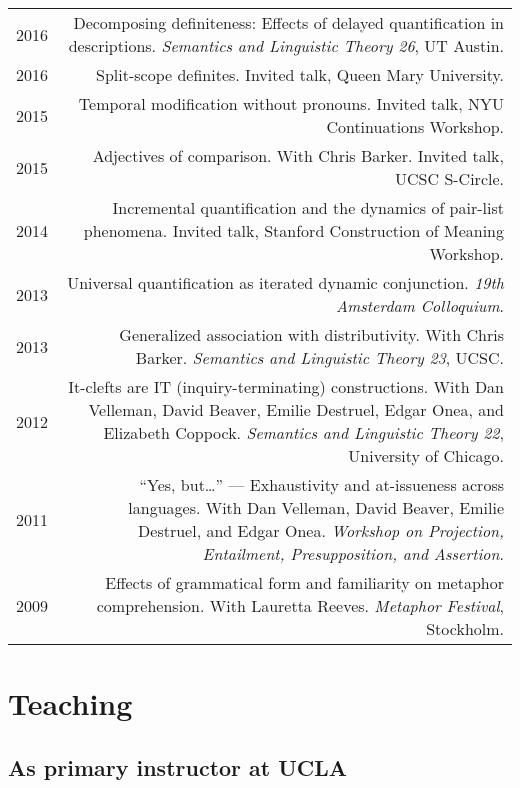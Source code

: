 \documentclass[12pt]{article}
\begin{document}
\begin{longtable}{LR}
  2016 & Decomposing definiteness: Effects of delayed quantification in
         descriptions.
         \textit{Semantics and Linguistic Theory 26}, UT Austin.\\
  2016 & Split-scope definites.
         Invited talk, Queen Mary University.\\
  2015 & Temporal modification without pronouns.
         Invited talk, NYU Continuations Workshop.\\
  2015 & Adjectives of comparison.
         With Chris Barker.
         Invited talk, UCSC S-Circle.\\
  2014 & Incremental quantification and the dynamics of pair-list phenomena.
         Invited talk, Stanford Construction of Meaning Workshop.\\
  2013 & Universal quantification as iterated dynamic conjunction.
         \textit{19th Amsterdam Colloquium}. \\
  2013 & Generalized association with distributivity.
         With Chris Barker.
         \textit{Semantics and Linguistic Theory 23}, UCSC.\\
  2012 & It-clefts are IT (inquiry-terminating) constructions.
         With Dan Velleman, David Beaver, Emilie Destruel, Edgar Onea, and
         Elizabeth Coppock.
         \textit{Semantics and Linguistic Theory 22}, University of Chicago.\\
  2011 & ``Yes, but\dots'' --- Exhaustivity and at-issueness across languages.
          With Dan Velleman, David Beaver, Emilie Destruel, and Edgar Onea.
          \textit{Workshop on Projection, Entailment, Presupposition, and
          Assertion}.\\
  2009 & Effects of grammatical form and familiarity on metaphor
         comprehension.
         With Lauretta Reeves.
         \textit{Metaphor Festival}, Stockholm.
\end{longtable}

\medskip

\section*{Teaching}

\subsection*{As primary instructor at UCLA}
\end{document}
